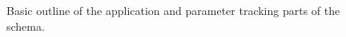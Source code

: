 \begin{figure}[hbtp]
  \begin{center}
    \caption{Basic outline of the application and parameter tracking parts of the schema. }
    \label{fig:appl}
  \end{center}
\end{figure}

